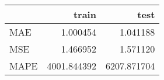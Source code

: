 \begin{tabular}{lrr}
\toprule
{} &        train &         test \\
\midrule
MAE  &     1.000454 &     1.041188 \\
MSE  &     1.466952 &     1.571120 \\
MAPE &  4001.844392 &  6207.871704 \\
\bottomrule
\end{tabular}
